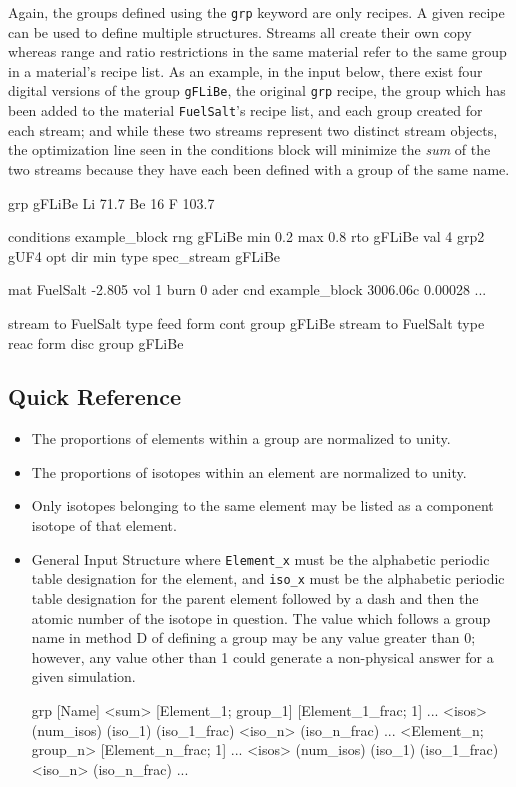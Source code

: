 Again, the groups defined using the \texttt{grp} keyword are only recipes. A
given recipe can be used to define multiple structures. Streams all create
their own copy whereas range and ratio restrictions in the same material refer
to the same group in a material's recipe list. As an example, in the input
below, there exist four digital versions of the group \texttt{gFLiBe}, the
original \texttt{grp} recipe, the group which has been added to the material
\texttt{FuelSalt}'s recipe list, and each group created for each stream; and
while these two streams represent two distinct stream objects, the optimization
line seen in the conditions block will minimize the \textit{sum} of the two
streams because they have each been defined with a group of the same name.

\begin{li}
grp gFLiBe
Li  71.7
Be  16
F   103.7

conditions example_block
rng gFLiBe min 0.2 max 0.8
rto gFLiBe val 4 grp2 gUF4
opt dir min type spec_stream gFLiBe

mat FuelSalt -2.805 vol 1 burn 0 ader cnd example_block
3006.06c    0.00028
...

stream to FuelSalt type feed form cont group gFLiBe
stream to FuelSalt type reac form disc group gFLiBe
\end{li}

\subsection{Quick Reference}\label{ssec:group_qr}

\begin{itemize}
    \item{The proportions of elements within a group are normalized to unity.}
    \item{The proportions of isotopes within an element are normalized to unity.}
    \item{Only isotopes belonging to the same element may be listed as a
            component isotope of that element.}
    \item{General Input Structure where \texttt{Element\_x} must be the
            alphabetic periodic table designation for the element, and
            \texttt{iso\_x} must be the alphabetic periodic table
            designation for the parent element followed by a dash
            and then the atomic number of the isotope in question. The value
            which follows a group name in method D of defining a group may
            be any value greater than 0; however, any value other than 1 
            could generate a non-physical answer for a given simulation.
\begin{lt}
grp [Name] <sum> [{Element_1; group_1}] [{Element_1_frac; 1}] ...
<isos> (num_isos) (iso_1) (iso_1_frac) <iso_n> (iso_n_frac) ...
<{Element_n; group_n}> [{Element_n_frac; 1}] ...
<isos> (num_isos) (iso_1) (iso_1_frac) <iso_n> (iso_n_frac) ...
\end{lt}
        }
\end{itemize}
